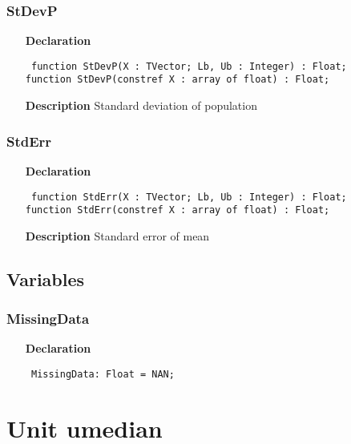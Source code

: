 \documentclass[12pt,a4paper,oneside]{report}
\newcommand{\declarationitem}[1]{\textbf{#1}}
\newcommand{\descriptiontitle}[1]{\textbf{#1}}
\newcommand{\code}[1]{\texttt{#1}}
\begin{document}
\subsubsection{StDevP}
\label{umeansd_md-StDevP}
\begin{itemize}\item[\declarationitem{Declaration}\hfill]
	\begin{flushleft}
		\code{
			function StDevP(X : TVector; Lb, Ub : Integer) : Float;}\\
		\code{function StDevP(constref X : array of float) : Float;}
	\end{flushleft}
	\item[\descriptiontitle{Description}]
	Standard deviation of population
\end{itemize}

\subsubsection{StdErr}
\label{umeansd_md-StdErr}
\begin{itemize}\item[\declarationitem{Declaration}\hfill]
	\begin{flushleft}
		\code{
			function StdErr(X : TVector; Lb, Ub : Integer) : Float;}\\
		\code{function StdErr(constref X : array of float) : Float;}
	\end{flushleft}
	\item[\descriptiontitle{Description}]
	Standard error of mean
\end{itemize}


\subsection{Variables}
\subsubsection{MissingData}
\label{umeansd_md-MissingData}
\begin{itemize}\item[\declarationitem{Declaration}\hfill]
	\begin{flushleft}
		\code{
			MissingData: Float = NAN;}
	\end{flushleft}
\end{itemize}
\section{Unit umedian}
\label{umedian}
\end{document}
